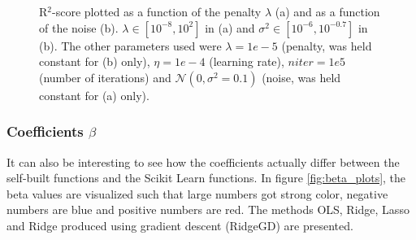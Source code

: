 \begin{figure} [H]%
	\centering
	\caption{R$^2$-score plotted as a function of the penalty $\lambda$ (a) and as a function of the noise (b). $\lambda\in[10^{-8},10^2]$ in (a) and $\sigma^2\in[10^{-6},10^{-0.7}]$ in (b). The other parameters used were $\lambda=1e-5$ (penalty, was held constant for (b) only), $\eta=1e-4$ (learning rate), $niter=1e5$ (number of iterations) and $\mathcal{N}(0, \sigma^2=0.1)$ (noise, was held constant for (a) only).}%
	\label{fig:R2_scores}
\end{figure}

\subsubsection{Coefficients $\beta$}
It can also be interesting to see how the coefficients actually differ between the self-built functions and the Scikit Learn functions. In figure \eqref{fig:beta_plots}, the beta values are visualized such that large numbers got strong color, negative numbers are blue and positive numbers are red. The methods OLS, Ridge, Lasso and Ridge produced using gradient descent (RidgeGD) are presented. 

